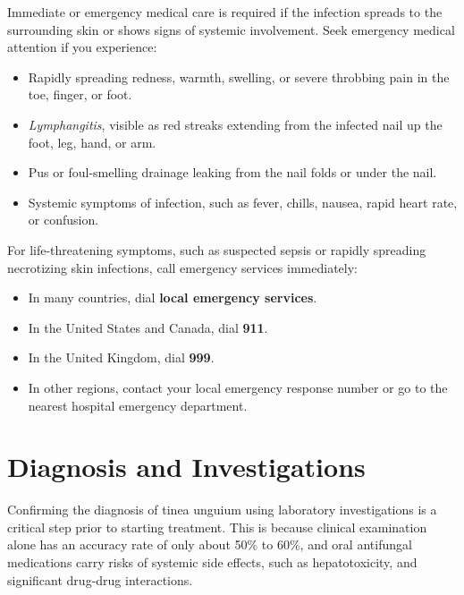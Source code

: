 Immediate or emergency medical care is required if the infection spreads to the surrounding skin or shows signs of systemic involvement. Seek emergency medical attention if you experience:
\begin{itemize}
    \item Rapidly spreading redness, warmth, swelling, or severe throbbing pain in the toe, finger, or foot.
    \item \textit{Lymphangitis}, visible as red streaks extending from the infected nail up the foot, leg, hand, or arm.
    \item Pus or foul-smelling drainage leaking from the nail folds or under the nail.
    \item Systemic symptoms of infection, such as fever, chills, nausea, rapid heart rate, or confusion.
\end{itemize}

For life-threatening symptoms, such as suspected sepsis or rapidly spreading necrotizing skin infections, call emergency services immediately:
\begin{itemize}
    \item In many countries, dial \textbf{local emergency services}.
    \item In the United States and Canada, dial \textbf{911}.
    \item In the United Kingdom, dial \textbf{999}.
    \item In other regions, contact your local emergency response number or go to the nearest hospital emergency department.
\end{itemize}

\section*{Diagnosis and Investigations}
Confirming the diagnosis of tinea unguium using laboratory investigations is a critical step prior to starting treatment. This is because clinical examination alone has an accuracy rate of only about 50\% to 60\%, and oral antifungal medications carry risks of systemic side effects, such as hepatotoxicity, and significant drug-drug interactions.

